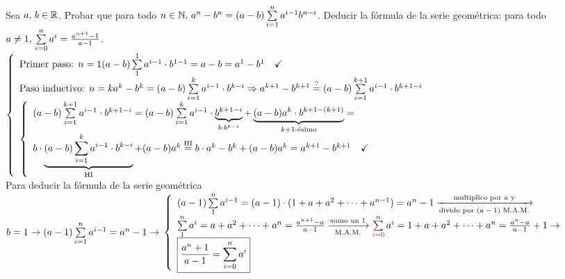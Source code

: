 \ejercicio
Sea $a,\, b \in \mathbb R$. Probar que para todo $n \in \mathbb N,\, a^n - b^n = (a-b) \sum\limits_{i = 1}^{n}a^{i-1}b^{n-i}$. Deducir la fórmula de la serie
geométrica: para todo $a \neq 1,\, \sum\limits_{i = 0}^{n}a^i = \frac{a^{n+1} - 1}{a-1}$.\\
$\llave{ l }{
		\text{Primer paso: } n = 1 (a-b) \sumatoria{1}{1} a^{i-1} \cdot b^{1-1} = a - b = a^1 - b^1 \Tilde\\
		\text{Paso inductivo: } n = k  a^k - b^k = (a-b) \sumatoria{i = 1}{k} a^{i-1} \cdot b^{k-i} \entonces
		a^{k+1} - b^{k+1} \eq?= (a-b) \sumatoria{i = 1}{k+1} a^{i-1} \cdot b^{k+1-i}\\
		\llave{l}{
			(a-b) \sumatoria{i = 1}{k+1} a^{i-1} \cdot b^{k+1-i} =
			(a-b) \sumatoria{i = 1}{k} a^{i-1} \cdot \underbrace{b^{k+1-i}}_{b\cdot b^{k-i}} +
			\kmasuno{
				(a - b) a^k \cdot b^{k+1-(k+1)}
			} = \\
			b \cdot
			\HI{
				(a-b) \sumatoria{i = 1}{k} a^{i-1} \cdot b^{k-i}
			} + (a - b) a^k \eqHI= b \cdot a^k - b^k + (a - b) a^k = a^{k+1} - b^{k+1}\Tilde
		}\\
	}$\\
Para deducir la fórmula de la serie geométrica $b = 1 \to (a-1) \sumatoria{i=1}{n} a^{i-1} = a^n - 1 \to\\
	\llave{ l }{
		(a-1) \sumatoria{1}{n} a^{i-1} = 
        (a-1) \cdot (1 + a + a^2 + \cdots + a^{n-1})  = a^n - 1
        \flecha{multiplico por $a$ y}[divido por $(a - 1)$ M.A.M.]\\
		\sumatoria{1}{n} a^i = a + a^2 + \cdots + a^n  = \frac{a^{n+1} - a}{a-1}
        \flecha{sumo un $1$}[M.A.M.]
		\sumatoria{\magenta{i = 0}}{n} a^i = 1 + a + a^2 + \cdots + a^n   = \frac{a^n - a}{a-1} + 1 \to\\
		\boxed{ \frac{a^n + 1}{a-1} =  \sumatoria{i = 0}{n} a^i  }
	}$

\ejercicio

\ejercicio

\ejercicio

\ejercicio

\ejercicio

